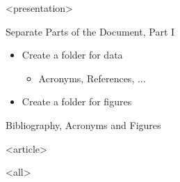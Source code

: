 \mode
<presentation>

\begin{frame}{Separate Parts of the Document, Part I}
  \label{separate:parts:baf}

  \begin{itemize}
    \item Create a folder for data
      \begin{itemize}
        \item Acronyms, References, ...
      \end{itemize}
    \item Create a folder for figures
  \end{itemize}

  \begin{block}{Bibliography, Acronyms and Figures}
  \end{block}

\end{frame}




\mode
<article>

\bigskip


\clearpage

\mode
<all>
